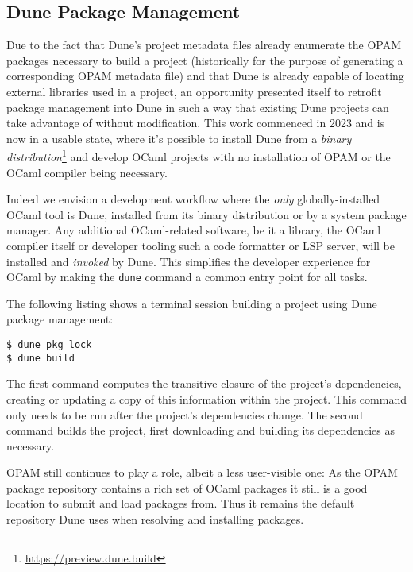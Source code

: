 \documentclass{article}
\begin{document}
\begin{multicols}{2}
        \section {Dune Package Management}

        Due to the fact that Dune's project metadata files already enumerate
        the OPAM packages necessary to build a project (historically for the
        purpose of generating a corresponding OPAM metadata file) and that Dune
        is already capable of locating external libraries used in a project, an
        opportunity presented itself to retrofit package management into Dune in
        such a way that existing Dune projects can take advantage of without
        modification. This work commenced in 2023 and is now in a usable state,
        where it's possible to install Dune from a \textit{binary
        distribution}\footnote{\url{https://preview.dune.build}} and develop OCaml
        projects with no installation of OPAM or the OCaml compiler being
        necessary.

        Indeed we envision a development workflow where the \textit{only}
        globally-installed OCaml tool is Dune, installed from its binary
        distribution or by a system package manager. Any additional
        OCaml-related software, be it a library, the OCaml compiler itself or
        developer tooling such a code formatter or LSP server, will be installed
        and \textit{invoked} by Dune. This simplifies the developer experience
        for OCaml by making the \texttt{dune} command a common entry point for all
        tasks.

        The following listing shows a terminal session building a project using
        Dune package management:
        \begin{lstlisting}
$ dune pkg lock
$ dune build
        \end{lstlisting}

        The first command computes the transitive closure of the project's
        dependencies, creating or updating a copy of this information within the
        project. This command only needs to be run after the project's
        dependencies change. The second command builds the project, first
        downloading and building its dependencies as necessary.

	OPAM still continues to play a role, albeit a less user-visible one: As
	the OPAM package repository contains a rich set of OCaml packages it
	still is a good location to submit and load packages from. Thus it
	remains the default repository Dune uses when resolving and installing
	packages.


\end{multicols}
\end{document}
